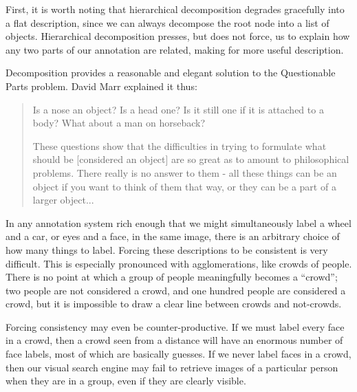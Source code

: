 First, it is worth noting that hierarchical decomposition degrades
gracefully into a flat description, since we can always decompose the
root node into a list of objects. Hierarchical decomposition presses,
but does not force, us to explain how any two parts of our annotation
are related, making for more useful description.

\bitem

\item Decomposition provides a reasonable and elegant solution to the
  Questionable Parts problem. David Marr explained it thus:
  \begin{quote}



    Is a nose an object? Is a head one?  Is it still one if it is
    attached to a body?  What about a man on horseback?

    These questions show that the difficulties in trying to formulate
    what should be [considered an object] %
    are so great as to amount to philosophical problems.  There really
    is no answer to them - all these things can be an object if you
    want to think of them that way, or they can be a part of a larger
    object...%
    \cite{marr}
  \end{quote}

  In any annotation system rich enough that we might simultaneously
  label a wheel and a car, or eyes and a face, in the same image,
  there is an arbitrary choice of how many things to label. Forcing
  these descriptions to be consistent is very
  difficult. \cite{labelme} This is especially pronounced with
  agglomerations, like crowds of people. There is no point at which a
  group of people meaningfully becomes a ``crowd''; two people are not
  considered a crowd, and one hundred people are considered a crowd,
  but it is impossible to draw a clear line between crowds and
  not-crowds.

Forcing consistency may even be counter-productive. If we must label
every face in a crowd, then a crowd seen from a distance will have an
enormous number of face labels, most of which are basically
guesses. If we never label faces in a crowd, then our visual search
engine may fail to retrieve images of a particular person when they
are in a group, even if they are clearly visible. 
  
